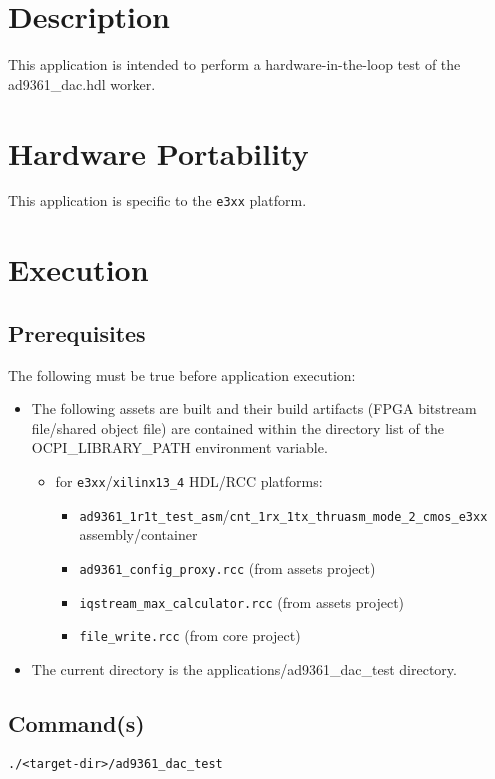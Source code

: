 \section{Description}
This application is intended to perform a hardware-in-the-loop test of the ad9361\_dac.hdl worker.

\section{Hardware Portability}
This application is specific to the \verb+e3xx+ platform.

\section{Execution}
\subsection{Prerequisites}
The following must be true before application execution:
\begin{itemize}
  \item The following assets are built and their build artifacts (FPGA bitstream file/shared object file) are contained within the directory list of the OCPI\_LIBRARY\_PATH environment variable.
  \begin{itemize}
    \item for \verb+e3xx+/\verb+xilinx13_4+ HDL/RCC platforms:
    \begin{itemize}
      \item \verb+ad9361_1r1t_test_asm+/\verb+cnt_1rx_1tx_thruasm_mode_2_cmos_e3xx+ assembly/container
      \item \verb+ad9361_config_proxy.rcc+ (from assets project)
      \item \verb+iqstream_max_calculator.rcc+ (from assets project)
      \item \verb+file_write.rcc+ (from core project)
    \end{itemize}
  \end{itemize}
\item The current directory is the applications/ad9361\_dac\_test directory.
\end{itemize}
\subsection{Command(s)}
\begin{lstlisting}
./<target-dir>/ad9361_dac_test
\end{lstlisting}

